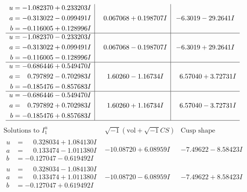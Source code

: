 \documentclass[1p]{elsarticle_modified}
\theoremstyle{definition}
\newcommand{\I}{\sqrt{-1}}
\begin{document}
$$\begin{array}{c|c|c}
\begin{aligned}
u &= -1.082370 + 0.233203 I \\
a &= -0.313022 - 0.099491 I \\
b &= -0.116005 + 0.128996 I\end{aligned}
 & \phantom{-}0.067068 + 0.198707 I & -6.3019 - 29.2641 I \\ \hline\begin{aligned}
u &= -1.082370 - 0.233203 I \\
a &= -0.313022 + 0.099491 I \\
b &= -0.116005 - 0.128996 I\end{aligned}
 & \phantom{-}0.067068 - 0.198707 I & -6.3019 + 29.2641 I \\ \hline\begin{aligned}
u &= -0.686446 + 0.549470 I \\
a &= \phantom{-}0.797892 - 0.702983 I \\
b &= -0.185476 - 0.857683 I\end{aligned}
 & \phantom{-}1.60260 - 1.16734 I & \phantom{-}6.57040 + 3.72731 I \\ \hline\begin{aligned}
u &= -0.686446 - 0.549470 I \\
a &= \phantom{-}0.797892 + 0.702983 I \\
b &= -0.185476 + 0.857683 I\end{aligned}
 & \phantom{-}1.60260 + 1.16734 I & \phantom{-}6.57040 - 3.72731 I\\
 \hline 
 \end{array}$$\newpage$$\begin{array}{c|c|c}  
\text{Solutions to }I^u_{1}& \I (\text{vol} + \sqrt{-1}CS) & \text{Cusp shape}\\
 \hline 
\begin{aligned}
u &= \phantom{-}0.328034 + 1.084130 I \\
a &= \phantom{-}0.133474 - 1.011380 I \\
b &= -0.127047 - 0.619492 I\end{aligned}
 & -10.08720 + 6.08959 I & -7.49622 - 8.58423 I \\ \hline\begin{aligned}
u &= \phantom{-}0.328034 - 1.084130 I \\
a &= \phantom{-}0.133474 + 1.011380 I \\
b &= -0.127047 + 0.619492 I\end{aligned}
 & -10.08720 - 6.08959 I & -7.49622 + 8.58423 I \\ \hline\begin{aligned}

\end{aligned}
\end{array}$$
\end{document}
